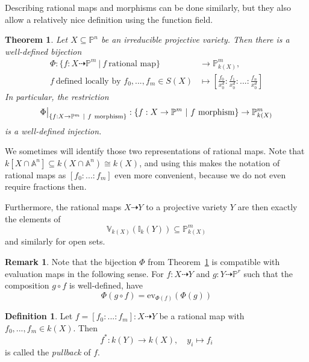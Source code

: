 \documentclass{scrartcl}
\newcommand{\I}{\mathbb{I}}
\newcommand{\V}{\mathbb{V}}
\newcommand{\Aff}{\mathbb{A}}
\newcommand{\Proj}{\mathbb{P}}
\newcommand\restr[2]{{
    \left.\kern-\nulldelimiterspace
    #1
    \vphantom{\big|}
    \right|_{#2}
}}
\newtheorem{theorem}[prop]{Theorem}
\theoremstyle{definition}
\newtheorem{definition}[prop]{Definition}
\newtheorem{remark}[prop]{Remark}
\begin{document}
Describing rational maps and morphisms can be done similarly, but they also allow a relatively nice definition using the function field.
\begin{theorem}
    \label{prop:rational_map_function_field}
    Let $X \subseteq \Proj^n$ be an irreducible projective variety. Then there is a well-defined bijection
    \begin{align*}
        \Phi: \{ f: X \dashrightarrow \Proj^m \ | \ f \ \text{rational map} \} &\to \Proj_{k(X)}^m, \\
        f \ \text{defined locally by $f_0, ..., f_m \in S(X)$} &\mapsto \left[ \frac {f_0} {x_0^d}  : \frac {f_1} {x_0^d} : ... : \frac {f_n} {x_0^d} \right]
    \end{align*}
    In particular, the restriction
    \begin{equation*}
        \restr{\Phi}{\{f: X \to \Proj^m \ | \ f \ \text{morphism}\}}: \{f: X \to \Proj^m \ | \ f \ \text{morphism}\} \to \Proj_{k(X)}^m
    \end{equation*}
    is a well-defined injection.
\end{theorem}
We sometimes will identify those two representations of rational maps.
Note that $k[X \cap \Aff^n] \subseteq k(X \cap \Aff^n) \cong k(X)$, and using this makes the notation of rational maps as $[f_0 : ... : f_m]$ even more convenient, because we do not even require fractions then.

Furthermore, the rational maps $X \dashrightarrow Y$ to a projective variety $Y$ are then exactly the elements of 
\begin{equation*}
    \V_{k(X)}(\I_k(Y)) \subseteq \Proj^m_{k(X)}
\end{equation*}
and similarly for open sets.

\begin{remark}
    Note that the bijection $\Phi$ from Theorem~\ref{prop:rational_map_function_field} is compatible with evaluation maps in the following sense.
    For $f: X \dashrightarrow Y$ and $g: Y \dashrightarrow \Proj^r$ such that the composition $g \circ f$ is well-defined, have
    \begin{equation*}
        \Phi(g \circ f) = \mathrm{ev}_{\Phi(f)}(\Phi(g))
    \end{equation*}
\end{remark}

\begin{definition}
    Let $f = [f_0 : ... : f_m]: X \dashrightarrow Y$ be a rational map with $f_0, ..., f_m \in k(X)$.
    Then
    \begin{equation*}
        f^*: k(Y) \to k(X), \quad y_i \mapsto f_i
    \end{equation*}
    is called the \emph{pullback} of $f$.
\end{definition}
\end{document}
